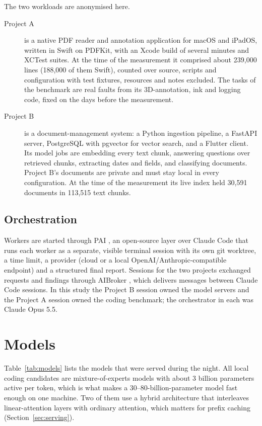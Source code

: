 The two workloads are anonymised here.
\begin{description}
	\item[Project A] is a native PDF reader and annotation application for macOS and iPadOS, written in Swift on
	PDFKit, with an Xcode build of several minutes and XCTest suites. At the time of the measurement it comprised
	about 239{,}000 lines (188{,}000 of them Swift), counted over source, scripts and configuration with test
	fixtures, resources and notes excluded. The tasks of the benchmark are real faults from
	its 3D-annotation, ink and logging code, fixed on the days before the measurement.
	\item[Project B] is a document-management system: a Python ingestion pipeline, a FastAPI server, PostgreSQL with
	pgvector \citep{Kane-2026aa} for vector search, and a Flutter client. Its model jobs are embedding every text chunk,
	answering questions over retrieved chunks, extracting dates and fields, and classifying documents. Project B's
	documents are private and must stay local in every configuration. At the time of the measurement its live index
	held 30{,}591 documents in 113{,}515 text chunks.
\end{description}

\subsection{Orchestration}

Workers are started through PAI \citep{Nott-2026aa}, an open-source layer over Claude Code that runs each worker as a
separate, visible terminal session with its own git worktree, a time limit, a provider (cloud or a local
OpenAI/Anthropic-compatible endpoint) and a structured final report. Sessions for the two projects exchanged
requests and findings through AIBroker \citep{Nott-2026ab}, which delivers messages between Claude Code sessions. In
this study the Project B session owned the model servers and the Project A session owned the coding benchmark; the
orchestrator in each was Claude Opus 5.5.

\section{Models}\label{sec:models}

Table~\ref{tab:models} lists the models that were served during the night. All local coding candidates are
mixture-of-experts models \citep{Shazeer-2017aa} with about 3 billion parameters active per token, which is what makes
a 30--80-billion-parameter model fast enough on one machine. Two of them use a hybrid architecture that interleaves
linear-attention layers \citep[Gated DeltaNet;][]{Yang-2025ab} with ordinary attention, which matters for prefix
caching (Section~\ref{sec:serving}).

